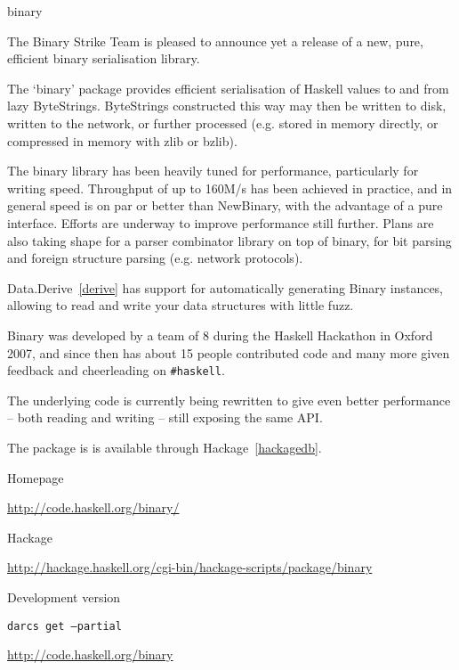 \begin{hcarentry}{binary}
\label{binary}
\makeheader

The Binary Strike Team is pleased to announce yet a release of a new,
pure, efficient binary serialisation library.

The `binary' package provides efficient serialisation of Haskell values
to and from lazy ByteStrings. ByteStrings constructed this way may then
be written to disk, written to the network, or further processed (e.g.
stored in memory directly, or compressed in memory with zlib or bzlib).

The binary library has been heavily tuned for performance, particularly for
writing speed. Throughput of up to 160M/s has been achieved in practice, and
in general speed is on par or better than NewBinary, with the advantage of a
pure interface. Efforts are underway to improve performance still further.
Plans are also taking shape for a parser combinator library on top of
binary, for bit parsing and foreign structure parsing (e.g. network
protocols).

Data.Derive~\cref{derive} has support for automatically generating Binary
instances, allowing to read and write your data structures with little fuzz.

Binary was developed by a team of 8 during the Haskell Hackathon in Oxford
2007, and since then has about 15 people contributed code and many more
given feedback and cheerleading on \verb|#haskell|.

The underlying code is currently being rewritten to give even better
performance -- both reading and writing -- still exposing the same API.

The package is is available through Hackage~\cref{hackagedb}.

\FurtherReading
\begin{compactitem}
\item Homepage

  \url{http://code.haskell.org/binary/}
\item Hackage

  \url{http://hackage.haskell.org/cgi-bin/hackage-scripts/package/binary}
\item Development version

  \texttt{darcs get --partial}

  \url{http://code.haskell.org/binary}
\end{compactitem}
\end{hcarentry}
